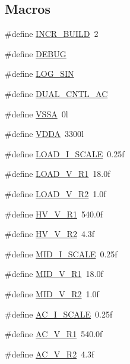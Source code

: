 \subsection*{Macros}
\begin{DoxyCompactItemize}
\item 
\#define \hyperlink{a00043_abf493281a7e64fe88660c38753e18d56}{I\-N\-C\-R\-\_\-\-B\-U\-I\-L\-D}~2
\item 
\#define \hyperlink{a00043_ad72dbcf6d0153db1b8d8a58001feed83}{D\-E\-B\-U\-G}
\item 
\#define \hyperlink{a00043_a95a028761977fbb3ad254501f0d9bf22}{L\-O\-G\-\_\-\-S\-I\-N}
\item 
\#define \hyperlink{a00043_a600b96e7a1d3cd28e228833bb61f8074}{D\-U\-A\-L\-\_\-\-C\-N\-T\-L\-\_\-\-A\-C}
\item 
\#define \hyperlink{a00043_a3c2e957a61cfa19e31e8477fe3aacab8}{V\-S\-S\-A}~0l
\item 
\#define \hyperlink{a00043_a2d52976aedaedf74a90019a689170620}{V\-D\-D\-A}~3300l
\item 
\#define \hyperlink{a00043_a0055f791c5646ebc3cacb7a9cf759792}{L\-O\-A\-D\-\_\-\-I\-\_\-\-S\-C\-A\-L\-E}~0.\-25f
\item 
\#define \hyperlink{a00043_a6e7bff785f71de22636e4e4fdc5c39d7}{L\-O\-A\-D\-\_\-\-V\-\_\-\-R1}~18.\-0f
\item 
\#define \hyperlink{a00043_a4717dea7b1bd4cf2cfcd40ad8a8b2637}{L\-O\-A\-D\-\_\-\-V\-\_\-\-R2}~1.\-0f
\item 
\#define \hyperlink{a00043_ab52968d537ec947fa219a56171653253}{H\-V\-\_\-\-V\-\_\-\-R1}~540.\-0f
\item 
\#define \hyperlink{a00043_a8569aeeace91f4d7ca9e68fa24d5a8f2}{H\-V\-\_\-\-V\-\_\-\-R2}~4.\-3f
\item 
\#define \hyperlink{a00043_a01632f54fd9c0f7d53a0e5c3fdc7c6e2}{M\-I\-D\-\_\-\-I\-\_\-\-S\-C\-A\-L\-E}~0.\-25f
\item 
\#define \hyperlink{a00043_a08a0080c0df15f8f1aff560c95563e65}{M\-I\-D\-\_\-\-V\-\_\-\-R1}~18.\-0f
\item 
\#define \hyperlink{a00043_a176ea315a270ecc6a601c5b0ce7203b5}{M\-I\-D\-\_\-\-V\-\_\-\-R2}~1.\-0f
\item 
\#define \hyperlink{a00043_a4489e85463a26954a958cd3d36732bd3}{A\-C\-\_\-\-I\-\_\-\-S\-C\-A\-L\-E}~0.\-25f
\item 
\#define \hyperlink{a00043_aae95393f182e274eceae9089a10720f7}{A\-C\-\_\-\-V\-\_\-\-R1}~540.\-0f
\item 
\#define \hyperlink{a00043_a34b8eef04869757d7d21a1e858ba98e7}{A\-C\-\_\-\-V\-\_\-\-R2}~4.\-3f

\end{DoxyCompactItemize}
